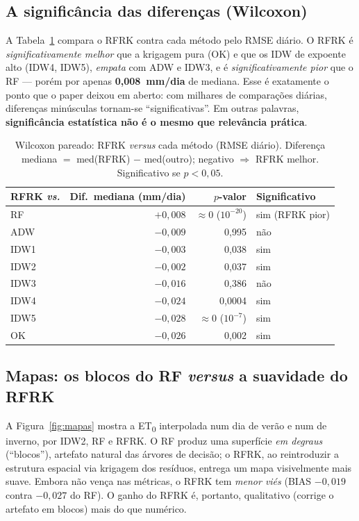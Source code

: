 \subsection{A significância das diferenças (Wilcoxon)}

A Tabela~\ref{tab:wilcoxon} compara o RFRK contra cada método pelo RMSE diário. O
RFRK é \emph{significativamente melhor} que a krigagem pura (OK) e que os IDW de
expoente alto (IDW4, IDW5), \emph{empata} com ADW e IDW3, e é
\emph{significativamente pior} que o RF --- porém por apenas \textbf{0,008~mm/dia}
de mediana. Esse é exatamente o ponto que o paper deixou em aberto: com milhares de
comparações diárias, diferenças minúsculas tornam-se ``significativas''. Em outras
palavras, \textbf{significância estatística não é o mesmo que relevância prática}.

\begin{table}[H]
  \centering
  \caption{Wilcoxon pareado: RFRK \emph{versus} cada método (RMSE diário). Diferença
  mediana $=$ med(RFRK) $-$ med(outro); negativo $\Rightarrow$ RFRK melhor.
  Significativo se $p<0{,}05$.}
  \label{tab:wilcoxon}
  \vspace{2pt}
  \begin{tabular}{lrrl}
    \toprule
    RFRK \emph{vs.} & Dif.\ mediana (mm/dia) & $p$-valor & Significativo \\
    \midrule
    RF   & $+0{,}008$ & $\approx 0$ ($10^{-20}$) & sim (RFRK pior) \\
    ADW  & $-0{,}009$ & 0,995    & não \\
    IDW1 & $-0{,}003$ & 0,038    & sim \\
    IDW2 & $-0{,}002$ & 0,037    & sim \\
    IDW3 & $-0{,}016$ & 0,386    & não \\
    IDW4 & $-0{,}024$ & 0,0004   & sim \\
    IDW5 & $-0{,}028$ & $\approx 0$ ($10^{-7}$) & sim \\
    OK   & $-0{,}026$ & 0,002    & sim \\
    \bottomrule
  \end{tabular}
\end{table}

\subsection{Mapas: os blocos do RF \emph{versus} a suavidade do RFRK}

A Figura~\ref{fig:mapas} mostra a ET\textsubscript{0} interpolada num dia de verão
e num de inverno, por IDW2, RF e RFRK. O RF produz uma superfície \emph{em degraus}
(``blocos''), artefato natural das árvores de decisão; o RFRK, ao reintroduzir a
estrutura espacial via krigagem dos resíduos, entrega um mapa visivelmente mais
suave. Embora não vença nas métricas, o RFRK tem \emph{menor viés} (BIAS $-0{,}019$
contra $-0{,}027$ do RF). O ganho do RFRK é, portanto, qualitativo (corrige o
artefato em blocos) mais do que numérico.

